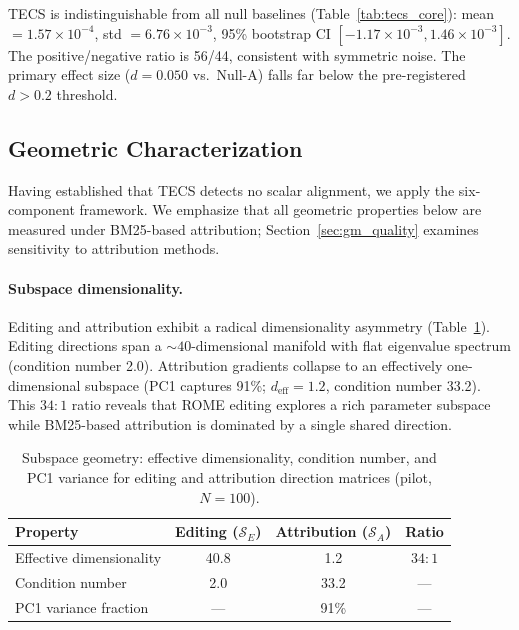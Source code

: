 TECS is indistinguishable from all null baselines (Table~\ref{tab:tecs_core}): mean $= 1.57 \times 10^{-4}$, std $= 6.76 \times 10^{-3}$, 95\% bootstrap CI $[-1.17 \times 10^{-3}, 1.46 \times 10^{-3}]$.
The positive/negative ratio is 56/44, consistent with symmetric noise.
The primary effect size ($d = 0.050$ vs.\ Null-A) falls far below the pre-registered $d > 0.2$ threshold.

\subsection{Geometric Characterization}
\label{sec:geometry}

Having established that TECS detects no scalar alignment, we apply the six-component framework.
We emphasize that all geometric properties below are measured under BM25-based attribution; Section~\ref{sec:gm_quality} examines sensitivity to attribution methods.

\paragraph{Subspace dimensionality.}
Editing and attribution exhibit a radical dimensionality asymmetry (Table~\ref{tab:subspace}).
Editing directions span a ${\sim}40$-dimensional manifold with flat eigenvalue spectrum (condition number 2.0).
Attribution gradients collapse to an effectively one-dimensional subspace (PC1 captures 91\%; $d_{\text{eff}} = 1.2$, condition number 33.2).
This $34{:}1$ ratio reveals that ROME editing explores a rich parameter subspace while BM25-based attribution is dominated by a single shared direction.

\begin{table}[t]
\caption{Subspace geometry: effective dimensionality, condition number, and PC1 variance for editing and attribution direction matrices (pilot, $N{=}100$).}
\label{tab:subspace}
\centering
\small
\begin{tabular}{@{}lccc@{}}
\toprule
Property & Editing ($\mathcal{S}_E$) & Attribution ($\mathcal{S}_A$) & Ratio \\
\midrule
Effective dimensionality & 40.8 & 1.2 & $34{:}1$ \\
Condition number & 2.0 & 33.2 & --- \\
PC1 variance fraction & --- & 91\% & --- \\
\bottomrule
\end{tabular}
\end{table}

